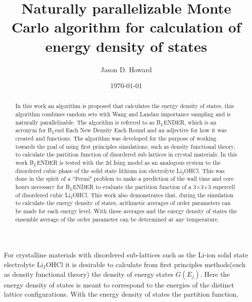 \documentclass[aps,prl,reprint,superscriptaddress,showkeys]{revtex4-1}
\begin{document}
\title{ Naturally   parallelizable  Monte Carlo  algorithm for calculation of energy density of states}

\author{Jason D. Howard}

\date{\today}

%


\begin{acknowledgments}
\end{acknowledgments}
\begin{abstract}
In this work  an algorithm  is proposed that calculates the energy density of states, this algorithm combines random sets with Wang and Landau importance sampling  and is naturally parallelizable. The algorithm is referred to as B$_L$ENDER, which is an acronym for B$_L$end Each New Density Each Round and an  adjective for  how it was created and functions. The algorithm was developed for the purpose of working towards the goal of using first principles simulations, such as density functional theory, to calculate the partition function of disordered sub lattices in crystal materials. In this work  B$_L$ENDER  is tested with the 2d Ising model as an analogous system to the disordered cubic phase of the solid state lithium ion electrolyte Li$_2$OHCl. This was done in the spirit of a ``Fermi" problem to make a prediction of the  wall time and core hours necessary for B$_L$ENDER to evaluate the partition function of a 3$\times$3$\times$3 supercell of disordered cubic Li$_2$OHCl. This work also demonstrates that, during the simulation to calculate the energy density of states, arithmetic averages of  order parameters can be made for each energy level. With these averages and the energy density of states the ensemble average of the order parameter can be determined at any temperature. 
\end{abstract}
\maketitle
For crystalline  materials  with disordered sub-lattices such as the Li-ion solid state electrolyte  Li$_2$OHCl\cite{Hood, Goodenough, Schwering, Holzwarth_group, Song_Borodin} it is desirable to calculate from first principles methods(such as density functional theory\cite{kohn:1965}) the density of energy states $G(E_j)$. Here the energy density of states is meant to correspond to the energies of the distinct lattice configurations. With the energy density of states the partition function,
\end{document}

